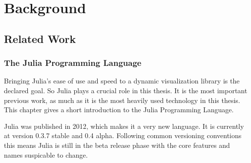 \section{Background}


\subsection{Related Work}

\subsubsection{The Julia Programming Language}
Bringing Julia's ease of use and speed to a dynamic visualization library is the declared goal.
So Julia plays a crucial role in this thesis. It is the most important previous work, as much as it is the most heavily used technology in this thesis.
This chapter gives a short introduction to the Julia Programming Language.

Julia was published in 2012, which makes it a very new language. It is currently at version 0.3.7 stable and 0.4 alpha.
Following common versioning conventions this means Julia is still in the beta release phase with the core features and names suspicable to change.

